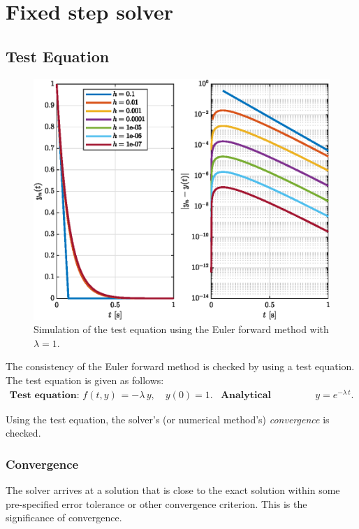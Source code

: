 \section{Fixed step solver}
\subsection{Test Equation}
\begin{figure}[h!]
	\centering
	\includegraphics[width=\textwidth]{Figures/ef_testCase.eps}
	\caption{Simulation of the test equation using the Euler forward method with $\lambda=1$.}
	\label{fig:testEF}
\end{figure}
The consistency of the Euler forward method is checked by using a test equation. The test equation is given as follows:
\begin{align*}
	\textbf{Test equation: }f(t,y) &= -\lambda\,y, \quad y(0) = 1. & \textbf{Analytical solution: } & y = e^{-\lambda\,t}.
\end{align*}

Using the test equation, the solver's (or numerical method's) \textit{convergence} is checked.

\subsubsection{Convergence}
The solver arrives at a solution that is close to the exact solution within some pre-specified error tolerance or other convergence criterion. This is the significance of convergence. %

